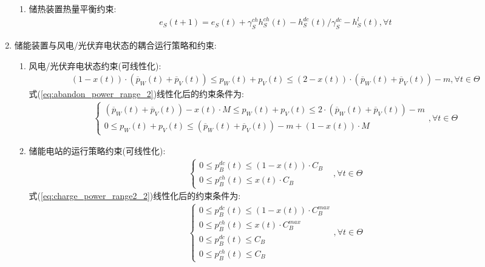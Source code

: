 \documentclass{article}
\begin{document}
\begin{enumerate}
{\begin{enumerate}
            \item {储热装置热量平衡约束:
                \begin{align}
                    e_S(t+1)=e_S(t)+\gamma_S^{ch}h_S^{ch}(t)-h_S^{dc}(t)/\gamma_S^{dc}-h_S^{l}(t),\forall t
                \end{align}
            }
        \end{enumerate}
    }
    \item {储能装置与风电/光伏弃电状态的耦合运行策略和约束:
        \begin{enumerate}
            \item {风电/光伏弃电状态约束({\color{red}可线性化}):
                \begin{align}
                    \left(1-x(t)\right)\cdot\left(\overline{p}_W(t)+\overline{p}_V(t)\right)\leq p_W(t)+p_V(t)\leq\left(2-x(t)\right)\cdot\left(\overline{p}_W(t)+\overline{p}_V(t)\right)-m,\forall t\in\Theta \label{eq:abandon_power_range_2}
                \end{align}
                式(\ref{eq:abandon_power_range_2})线性化后的约束条件为:
                \begin{align}
                    \begin{cases}
                        \left(\overline{p}_W(t)+\overline{p}_V(t)\right)-x(t)\cdot M \leq p_W(t)+p_V(t)\leq 2\cdot\left(\overline{p}_W(t)+\overline{p}_V(t)\right)-m\\
                        0 \leq p_W(t)+p_V(t)\leq\left(\overline{p}_W(t)+\overline{p}_V(t)\right)-m+(1-x(t))\cdot M
                    \end{cases},\forall t\in\Theta
                \end{align}
            }
            \item {储能电站的运行策略约束({\color{red}可线性化}):
                \begin{align}
                    \begin{cases}0\leq p_B^{dc}\left(t\right)\leq\left(1-x(t)\right)\cdot C_B\\0\leq p_B^{ch}\left(t\right)\leq x(t)\cdot C_B&\end{cases},\forall t\in\Theta \label{eq:charge_power_range2_2}
                \end{align}
                式(\ref{eq:charge_power_range2_2})线性化后的约束条件为:
                \begin{align}
                    \begin{cases}
                        0\leq p_B^{dc}\left(t\right)\leq\left(1-x(t)\right)\cdot C_B^{max}\\
                        0\leq p_B^{ch}\left(t\right)\leq x(t)\cdot C_B^{max}\\
                        0\leq p_B^{dc}\left(t\right)\leq C_B\\
                        0\leq p_B^{ch}\left(t\right)\leq C_B
                    \end{cases},\forall t\in\Theta
                \end{align}
            }
        \end{enumerate}
    }
\end{enumerate}
\end{document}
